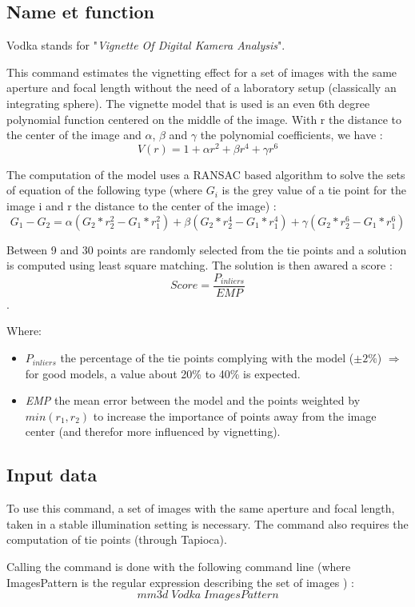 \subsection{Name et function}
Vodka stands for "\textit{Vignette Of Digital Kamera Analysis}".

This command estimates the vignetting effect for a set of images with the same aperture and focal length without the need of a laboratory setup (classically an integrating sphere). The vignette model that is used is an even 6th degree polynomial function centered on the middle of the image. With r the distance to the center of the image and $\alpha$, $\beta$ and $\gamma$ the polynomial coefficients, we have : \[V(r)=1+ \alpha r^2 + \beta r^4 + \gamma r^6\]


The computation of the model uses a RANSAC based algorithm to solve the sets of equation of the following type (where $G_{i}$ is the grey value of a tie point for the image i and r the distance to the center of the image) : \[ G_{1}-G_{2}=\alpha(G_{2}*r_{2}^2-G_{1}*r_{1}^2)+\beta(G_{2}*r_{2}^4-G_{1}*r_{1}^4)+\gamma(G_{2}*r_{2}^6-G_{1}*r_{1}^6) \] 

Between 9 and 30 points are randomly selected from the tie points and a solution is computed using least square matching. The solution is then awared a score : \[Score=\frac{P_{inliers}}{EMP}\].

Where:
\begin{itemize}
\item \textit{$P_{inliers}$} the percentage of the tie points complying with the model ($\pm 2\%$) $\Rightarrow$ for good models, a value about 20\% to 40\% is expected.

\item \textit{EMP} the mean error between the model and the points weighted by $min(r_{1},r_{2})$ to increase the importance of points away from the image center (and therefor more influenced by vignetting).
\end{itemize}


\subsection{Input data}
To use this command, a set of images with the same aperture and focal length, taken in a stable illumination setting is necessary. The command also requires the computation of tie points (through Tapioca).


Calling the command is done with the following command line (where ImagesPattern is the regular expression describing the set of images ) : \[mm3d\;Vodka\;ImagesPattern\] 

